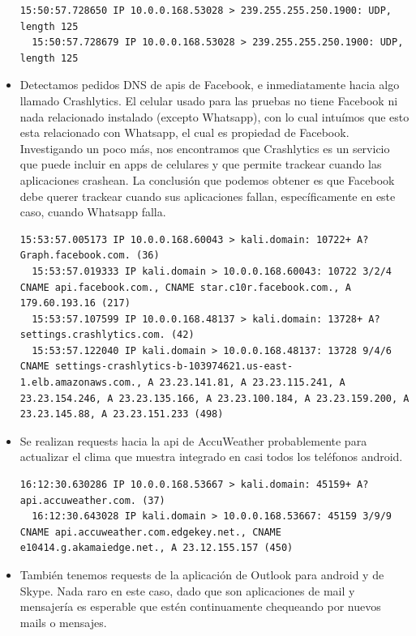 \begin{itemize}
\begin{lstlisting}[style=base]
  15:50:57.728650 IP 10.0.0.168.53028 > 239.255.255.250.1900: UDP, length 125
  15:50:57.728679 IP 10.0.0.168.53028 > 239.255.255.250.1900: UDP, length 125
\end{lstlisting}

\item Detectamos pedidos DNS de apis de Facebook, e inmediatamente hacia algo llamado Crashlytics. El celular usado para las pruebas no 
tiene Facebook ni nada relacionado instalado (excepto Whatsapp), con lo cual intuímos que esto esta relacionado con Whatsapp, el cual 
es propiedad de Facebook. Investigando un poco más, nos encontramos que Crashlytics es un servicio que puede incluir en apps de 
celulares y que permite trackear cuando las aplicaciones crashean. La conclusión que podemos obtener es que Facebook debe 
querer trackear cuando sus aplicaciones fallan, específicamente en este caso, cuando Whatsapp falla.

\begin{lstlisting}[style=base]
  15:53:57.005173 IP 10.0.0.168.60043 > kali.domain: 10722+ A? Graph.facebook.com. (36)
  15:53:57.019333 IP kali.domain > 10.0.0.168.60043: 10722 3/2/4 CNAME api.facebook.com., CNAME star.c10r.facebook.com., A 179.60.193.16 (217)
  15:53:57.107599 IP 10.0.0.168.48137 > kali.domain: 13728+ A? settings.crashlytics.com. (42)
  15:53:57.122040 IP kali.domain > 10.0.0.168.48137: 13728 9/4/6 CNAME settings-crashlytics-b-103974621.us-east-1.elb.amazonaws.com., A 23.23.141.81, A 23.23.115.241, A 23.23.154.246, A 23.23.135.166, A 23.23.100.184, A 23.23.159.200, A 23.23.145.88, A 23.23.151.233 (498)
\end{lstlisting}

\item Se realizan requests hacia la api de AccuWeather probablemente para actualizar el clima que muestra integrado en casi todos los 
teléfonos android.

\begin{lstlisting}[style=base]
  16:12:30.630286 IP 10.0.0.168.53667 > kali.domain: 45159+ A? api.accuweather.com. (37)
  16:12:30.643028 IP kali.domain > 10.0.0.168.53667: 45159 3/9/9 CNAME api.accuweather.com.edgekey.net., CNAME e10414.g.akamaiedge.net., A 23.12.155.157 (450)
\end{lstlisting}

\item También tenemos requests de la aplicación de Outlook para android y de Skype. Nada raro en este caso, dado que son aplicaciones de 
mail y mensajería es esperable que estén continuamente chequeando por nuevos mails o mensajes.


\end{itemize}
